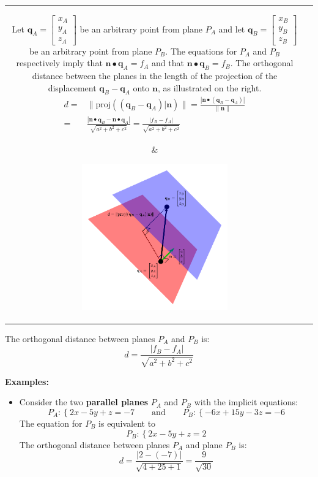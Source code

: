 \documentclass{article}
\begin{document}
\begin{tabular}{cc}
\parbox{0.5\textwidth}{
Let \(\mathbf{q}_A = \begin{bmatrix} x_A \\ y_A \\ z_A \end{bmatrix}\) be an arbitrary point from plane \(P_A\) and let \(\mathbf{q}_B = \begin{bmatrix} x_B \\ y_B \\ z_B \end{bmatrix}\) be an arbitrary point from plane \(P_B\). The equations for \(P_A\) and \(P_B\) respectively imply that \(\mathbf{n} \bullet \mathbf{q}_A = f_A\) and that \(\mathbf{n} \bullet \mathbf{q}_B = f_B\). The orthogonal distance between the planes in the length of the projection of the displacement \(\mathbf{q}_B - \mathbf{q}_A\) onto \(\mathbf{n}\), as illustrated on the right. 
\begin{align*}
d = & \|\text{proj}((\mathbf{q}_B - \mathbf{q}_A)|\mathbf{n})\| = \frac{|\mathbf{n} \bullet (\mathbf{q}_B - \mathbf{q}_A)|}{\|\mathbf{n}\|} \\ 
= & \frac{|\mathbf{n} \bullet \mathbf{q}_B - \mathbf{n} \bullet \mathbf{q}_A|}{\sqrt{a^2 + b^2 + c^2}}
= \frac{|f_B - f_A|}{\sqrt{a^2 + b^2 + c^2}}
\end{align*}
} & \parbox{0.5\textwidth}{
\includegraphics[width = 0.5\textwidth]{plane_plane_distance}
}
\end{tabular}
The orthogonal distance between planes \(P_A\) and \(P_B\) is: 
\[d = \frac{|f_B - f_A|}{\sqrt{a^2 + b^2 + c^2}}\]

\textbf{Examples:}
\begin{itemize}
\item Consider the two {\bf parallel planes} \(P_A\) and \(P_B\) with the implicit equations:
\[P_A : \left\{2x - 5y + z  = -7\right. \quad\quad\text{and}\quad\quad P_B : \left\{-6x + 15y -3z = -6\right.\]
The equation for \(P_B\) is equivalent to
\[P_B : \left\{2x - 5y + z = 2\right.\] 
The orthogonal distance between planes \(P_A\) and plane \(P_B\) is: 
\[d = \frac{|2 - (-7)|}{\sqrt{4 + 25 + 1}} = \frac{9}{\sqrt{30}}\]
\end{itemize}
\end{document}
